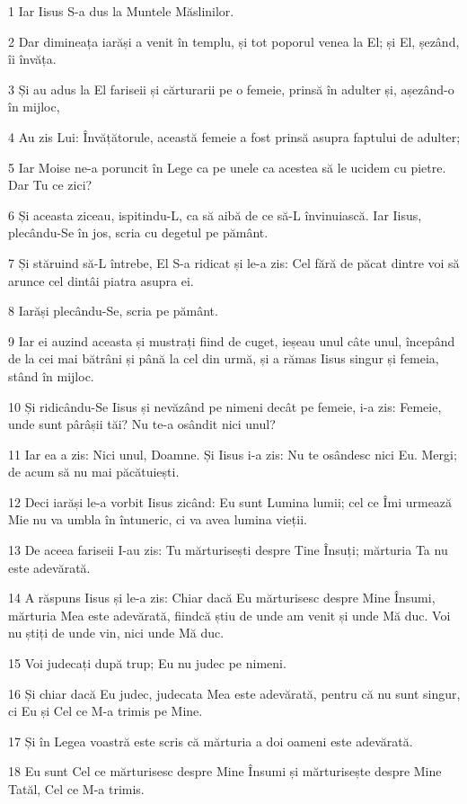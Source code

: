 \par 1 Iar Iisus S-a dus la Muntele Măslinilor.
\par 2 Dar dimineața iarăși a venit în templu, și tot poporul venea la El; și El, șezând, îi învăța.
\par 3 Și au adus la El fariseii și cărturarii pe o femeie, prinsă în adulter și, așezând-o în mijloc,
\par 4 Au zis Lui: Învățătorule, această femeie a fost prinsă asupra faptului de adulter;
\par 5 Iar Moise ne-a poruncit în Lege ca pe unele ca acestea să le ucidem cu pietre. Dar Tu ce zici?
\par 6 Și aceasta ziceau, ispitindu-L, ca să aibă de ce să-L învinuiască. Iar Iisus, plecându-Se în jos, scria cu degetul pe pământ.
\par 7 Și stăruind să-L întrebe, El S-a ridicat și le-a zis: Cel fără de păcat dintre voi să arunce cel dintâi piatra asupra ei.
\par 8 Iarăși plecându-Se, scria pe pământ.
\par 9 Iar ei auzind aceasta și mustrați fiind de cuget, ieșeau unul câte unul, începând de la cei mai bătrâni și până la cel din urmă, și a rămas Iisus singur și femeia, stând în mijloc.
\par 10 Și ridicându-Se Iisus și nevăzând pe nimeni decât pe femeie, i-a zis: Femeie, unde sunt pârâșii tăi? Nu te-a osândit nici unul?
\par 11 Iar ea a zis: Nici unul, Doamne. Și Iisus i-a zis: Nu te osândesc nici Eu. Mergi; de acum să nu mai păcătuiești.
\par 12 Deci iarăși le-a vorbit Iisus zicând: Eu sunt Lumina lumii; cel ce Îmi urmează Mie nu va umbla în întuneric, ci va avea lumina vieții.
\par 13 De aceea fariseii I-au zis: Tu mărturisești despre Tine Însuți; mărturia Ta nu este adevărată.
\par 14 A răspuns Iisus și le-a zis: Chiar dacă Eu mărturisesc despre Mine Însumi, mărturia Mea este adevărată, fiindcă știu de unde am venit și unde Mă duc. Voi nu știți de unde vin, nici unde Mă duc.
\par 15 Voi judecați după trup; Eu nu judec pe nimeni.
\par 16 Și chiar dacă Eu judec, judecata Mea este adevărată, pentru că nu sunt singur, ci Eu și Cel ce M-a trimis pe Mine.
\par 17 Și în Legea voastră este scris că mărturia a doi oameni este adevărată.
\par 18 Eu sunt Cel ce mărturisesc despre Mine Însumi și mărturisește despre Mine Tatăl, Cel ce M-a trimis.
